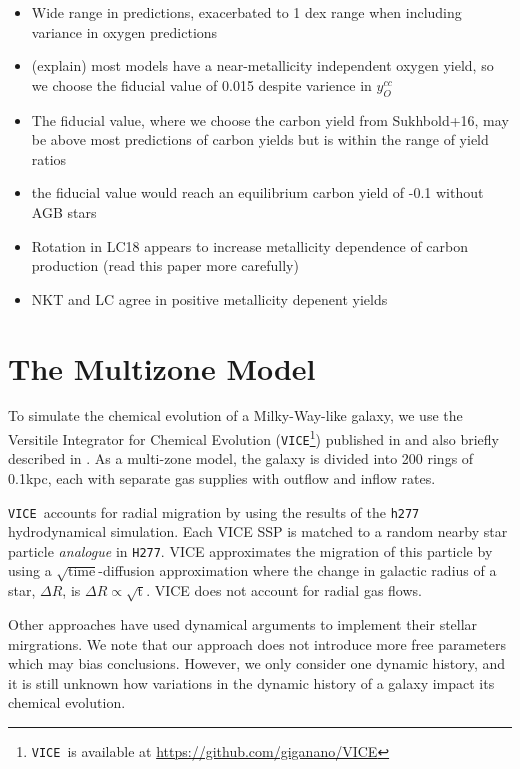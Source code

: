 \documentclass[12pt,oneside]{report}
\newcommand{\VICE}{\texttt{VICE}}
\begin{document}
    \begin{itemize}
        \item Wide range in predictions, exacerbated to 1 dex range when including variance in oxygen predictions
        \item (explain) most models have a near-metallicity independent oxygen yield, so we choose the fiducial value of 0.015 despite varience in $y_O^{cc}$
        \item The fiducial value, where we choose the carbon yield from Sukhbold+16, may be above most predictions of carbon yields but is within the range of yield ratios
        \item the fiducial value would reach an equilibrium carbon yield of -0.1 without AGB stars
        \item Rotation in LC18 appears to increase metallicity dependence of carbon production (read this paper more carefully)
        \item NKT and LC agree in positive metallicity depenent yields
    \end{itemize}
    

\chapter{The Multizone Model}\label{sec:vice}

To simulate the chemical evolution of a Milky-Way-like galaxy, we use the Versitile Integrator for Chemical Evolution (\VICE\footnote{\VICE~is available at \url{https://github.com/giganano/VICE}}) published in \citet{james+21} and also briefly described in \citet{james+22}.  As a multi-zone model, the galaxy is divided into 200 rings of 0.1kpc, each with separate gas supplies with outflow and inflow rates. 


\VICE\ accounts for radial migration by using the results of the \texttt{h277} hydrodynamical simulation. Each VICE SSP is matched to a random nearby star particle \textit{analogue} in \texttt{H277}. VICE approximates the migration of this particle by using a $\sqrt{\text{time}}$-diffusion approximation where the change in galactic radius of a star, $\Delta R$, is $\Delta R \propto \sqrt{\text{t}}$. 
VICE does not account for radial gas flows. 

Other approaches have used dynamical arguments to implement their stellar mirgrations. We note that our approach does not introduce more free parameters which may bias conclusions. However, we only consider one dynamic history, and it is still unknown how variations in the dynamic history of a galaxy impact its chemical evolution.
\end{document}
